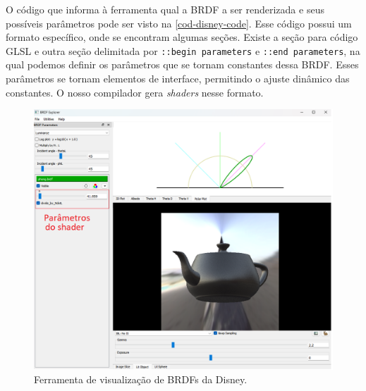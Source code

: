O código que informa à ferramenta qual a BRDF a ser renderizada e seus possíveis parâmetros pode ser visto na \autoref{cod-disney-code}. Esse código possui um formato específico, onde se encontram algumas seções.
Existe a seção para código GLSL e outra seção delimitada por \texttt{::begin parameters} e \texttt{::end parameters}, na qual podemos definir os parâmetros que se tornam constantes dessa BRDF. Esses parâmetros se tornam elementos de interface, permitindo o ajuste dinâmico das constantes. O nosso compilador gera \textit{shaders} nesse formato.



\begin{figure}[htb]
        \caption{\label{fig-disney-tool} \small Ferramenta de visualização de BRDFs da Disney.}
        \begin{center}
            \includegraphics[scale=0.55]{./Imagens/disney-tool-new.png}
        \end{center}
\end{figure}

